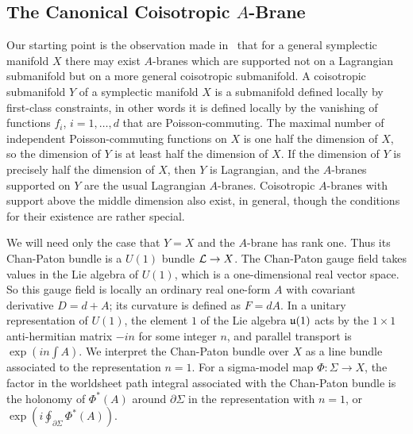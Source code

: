 
\subsection{The Canonical Coisotropic $A$-Brane}

Our starting point is the observation made in \cite{ref80}\ that for a
general symplectic manifold $X$ there may exist $A$-branes which
are supported not on a Lagrangian submanifold but on a more
general coisotropic submanifold. A coisotropic submanifold $Y$ of
a symplectic manifold $X$ is a submanifold  defined locally by
first-class constraints, in other words it is defined locally by
the vanishing of functions $f_i$, $i=1,\dots,d$ that are
Poisson-commuting.  The maximal number of independent
Poisson-commuting functions on $X$ is one half the dimension of
$X$, so the dimension of $Y$ is at least half the dimension of
$X$.  If the dimension of $Y$ is precisely half the dimension of
$X$, then $Y$ is Lagrangian, and the $A$-branes supported on $Y$
are the usual Lagrangian $A$-branes.  Coisotropic $A$-branes with
support above the middle dimension also exist, in general, though
the conditions for their existence are rather special.

We will need only  the case that $Y=X$ and the $A$-brane has rank
one. Thus its Chan-Paton bundle is a $U(1)$ bundle ${\cal L}\to
X$. The Chan-Paton gauge field takes values in the Lie algebra of
$U(1)$, which is a one-dimensional real vector space. So this
gauge field is locally an ordinary real one-form $A$ with
covariant derivative $D=d+A$; its curvature is defined as $F=dA$.
In a unitary representation of $U(1)$, the element $1$ of the Lie
algebra $\frak{u}(1)$ acts by the $1\times 1$ anti-hermitian
matrix $-in$ for some integer $n$, and parallel transport is
$\exp(in\int A)$.  We interpret the Chan-Paton bundle over $X$ as a
line bundle associated to the representation $n=1$.  For a
sigma-model map $\Phi:\Sigma\to X$, the factor in the worldsheet
path integral associated with the Chan-Paton bundle is the
holonomy of $\Phi^*(A)$ around $\partial\Sigma$ in the
representation with $n=1$, or
$\exp(i\oint_{\partial\Sigma}\Phi^*(A))$.

